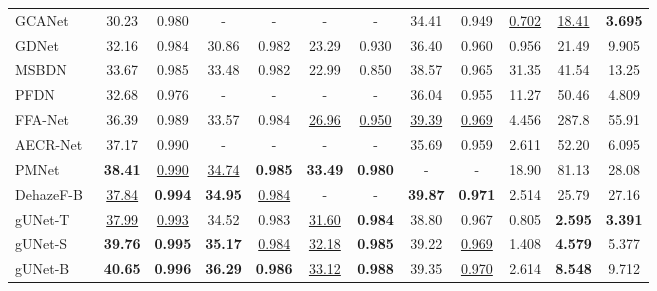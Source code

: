 \documentclass[10pt,twocolumn,letterpaper]{article}
\newcommand{\gr}{\rowcolor[rgb]{0.95,0.97,1.0}}
\begin{document}
\begin{table*}[t]
\begin{center}
{\begin{threeparttable}
\begin{tabular}{lccccccccccc}
                \gr GCANet~\cite{chen2019gated}       & 30.23 & 0.980  & -     & -      & -     & -      & 34.41 & 0.949  & \underline{0.702}       & \underline{18.41}    & \textbf{3.695}        \\
                GDNet~\cite{liu2019griddehazenet}     & 32.16 & 0.984  & 30.86 & 0.982  & 23.29 & 0.930  & 36.40 & 0.960  & 0.956       & 21.49    & 9.905        \\
                \gr MSBDN~\cite{dong2020multi}        & 33.67 & 0.985  & 33.48 & 0.982  & 22.99 & 0.850  & 38.57 & 0.965  & 31.35       & 41.54    & 13.25        \\
                PFDN~\cite{dong2020physics}           & 32.68 & 0.976  & -     & -      & -     & -      & 36.04 & 0.955  & 11.27       & 50.46    & 4.809        \\
                \gr FFA-Net~\cite{qin2020ffa}         & 36.39 & 0.989  & 33.57 & 0.984  & \underline{26.96} & \underline{0.950}  & \underline{39.39} & \underline{0.969}  & 4.456       & 287.8    & 55.91        \\
                AECR-Net~\cite{wu2021contrastive}     & 37.17 & 0.990  & -     & -      & -     & -      & 35.69 & 0.959  & 2.611       & 52.20    & 6.095        \\
                \gr PMNet~\cite{ye2021perceiving}     & \textbf{38.41} & \underline{0.990}  & \underline{34.74} & \textbf{0.985}  & \textbf{33.49} & \textbf{0.980}  & -     & -      & 18.90       & 81.13    & 28.08        \\
                DehazeF-B~\cite{song2022vision}       & \underline{37.84} & \textbf{0.994}  & \textbf{34.95} & \underline{0.984}  & -     & -      & \textbf{39.87} & \textbf{0.971}  & 2.514       & 25.79    & 27.16        \\
                \hline
                \gr gUNet-T                           & \underline{37.99} & \underline{0.993} & {34.52} & {0.983} & \underline{31.60} & \textbf{0.984} & {38.80} & {0.967} & {0.805} & \textbf{2.595} & \textbf{3.391} \\
                \gr gUNet-S                           & \textbf{39.76} & \textbf{0.995} & \textbf{35.17} & \underline{0.984} & \underline{32.18} & \textbf{0.985} & {39.22} & \underline{0.969} & {1.408} & \textbf{4.579} & {5.377} \\
                \gr gUNet-B                           & \textbf{40.65} & \textbf{0.996} & \textbf{36.29} & \textbf{0.986} & \underline{33.12} & \textbf{0.988} & {39.35} & \underline{0.970} & {2.614} & \textbf{8.548} & {9.712} \\

\end{tabular}
\end{threeparttable}}
\end{center}
\end{table*}
\end{document}
